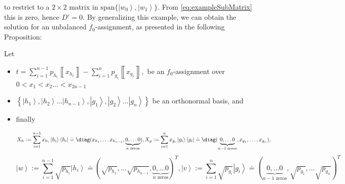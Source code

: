 \documentclass{theoretics}
\begin{document}
to restrict to a $2\times2$ matrix in $\text{span}\{\left|w_{0}\right\rangle ,\left|w_{1}\right\rangle \}$.
From \ref{eq:exampleSubMatrix} this is zero,
hence $D'=0$. By generalizing this example, we can obtain the solution for an unbalanced $f_{0}$-assignment, as presented in the following Proposition:
\begin{proposition}\label{prop:unbalancedf0algeb}
  Let
  \begin{itemize}
    \item $
            t=\sum_{i=1}^{n-1}p_{h_{i}}\left\llbracket x_{h_{i}}\right\rrbracket -\sum_{i=1}^{n}p_{g_{i}}\left\llbracket x_{g_{i}}\right\rrbracket ,
          $ be an $f_{0}$-assignment over $0<x_{1}<x_{2}\dots<x_{2n-1}$
    \item $\left\{ \left|h_{1}\right\rangle ,\left|h_{2}\right\rangle \dots\left|h_{n-1}\right\rangle ,\left|g_{1}\right\rangle ,\left|g_{2}\right\rangle \dots\left|g_{n}\right\rangle \right\} $
          be an orthonormal basis, and
    \item finally
          \begin{footnotesize}
            \begin{displaymath}
              X_{h}:=\sum_{i=1}^{n-1}x_{h_{i}}\left|h_{i}\right\rangle \left\langle h_{i}\right|\doteq\diag(x_{h_{1}},\dots x_{h_{n-1}},\underbrace{0,\dots0}_{n\text{ zeros}}),
              X_{g}:=\sum_{i=1}^{n}x_{g_{i}}\left|g_{i}\right\rangle \left\langle g_{i}\right|\doteq\diag(\underbrace{0,\dots0}_{n-1\text{ zeros}},x_{g_{1}},\dots,x_{g_{n}}),
            \end{displaymath}
            \begin{displaymath}
              \left|w\right\rangle :=\sum_{i=1}^{n-1}\sqrt{p_{h_{i}}}\left|h_{i}\right\rangle \doteq(\sqrt{p_{h_{1}}},\dots\sqrt{p_{h_{n-1}}},\underbrace{0,\dots0}_{n\text{ zeros}})^{T},
              \left|v\right\rangle :=\sum_{i=1}^{n}\sqrt{p_{g_{i}}}\left|g_{i}\right\rangle \doteq(\underbrace{0,\dots0}_{n-1\text{ zeros}},\sqrt{p_{g_{1}}},\dots\sqrt{p_{g_{n}}})^{T}
            \end{displaymath}
          \end{footnotesize}


\end{itemize}
\end{proposition}
\end{document}
